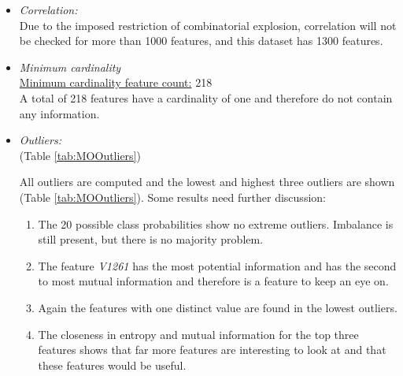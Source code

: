 \documentclass[10pt,a4paper]{report}
\begin{document}
	\begin{itemize}
		\item \textit{Correlation:} \\
		
		Due to the imposed restriction of combinatorial explosion, correlation will not be checked for more than 1000 features, and this dataset has 1300 features.
		
		\item \textit{Minimum cardinality} \\
		\underline{Minimum cardinality feature count:} 218 \\
		
		A total of 218 features have a cardinality of one and therefore do not contain any information.
		
		\item \textit{Outliers:} \\
		(Table \ref{tab:MOOutliers})
		
		All outliers are computed and the lowest and highest three outliers are shown (Table \ref{tab:MOOutliers}). Some results need further discussion:
		
		\begin{enumerate}
			\item The 20 possible class probabilities show no extreme outliers. Imbalance is still present, but there is no majority problem.
			\item The feature \textit{V1261} has the most potential information and has the second to most mutual information and therefore is a feature to keep an eye on.
			\item Again the features with one distinct value are found in the lowest outliers.
			\item The closeness in entropy and mutual information for the top three features shows that far more features are interesting to look at and that these features would be useful.
		\end{enumerate}
		

\end{itemize}
\end{document}
